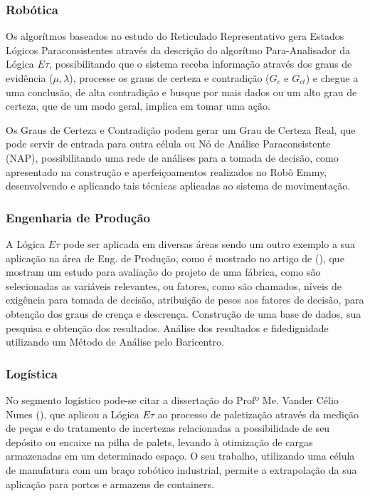 \subsubsection{Robótica}

Os algorítmos baseados no estudo do Reticulado Representativo gera 
Estados Lógicos Paraconsistentes através da 
descrição do algorítmo Para-Analisador da Lógica $E\tau$, 
possibilitando que o sistema receba informação 
através dos graus de evidência ($\mu, \lambda$), 
processe os graus de certeza e contradição ($G_c$ e $G_{ct}$) e 
chegue a uma conclusão, de alta contradição e busque por mais dados ou 
um alto grau de certeza, que de um modo geral, implica em tomar uma ação. 

Os Graus de Certeza e Contradição podem gerar um Grau de Certeza Real, 
que pode servir de entrada para outra célula ou 
Nó de Análise Paraconsistente (NAP), 
possibilitando uma rede de análises para a tomada de decisão,
como apresentado na construção e aperfeiçoamentos realizados no Robô Emmy,
\cite{JoaoInacio}\cite{ClaudioRodrigoTorres} 
desenvolvendo e aplicando tais técnicas aplicadas ao sistema de movimentação.

\subsubsection{Engenharia de Produção}

A Lógica $E\tau$ pode ser aplicada em diversas áreas 
sendo um outro exemplo a sua aplicação na 
área de Eng. de Produção, 
como é mostrado no artigo de 
\citeauthor{FabioIsraelJair}(\citeyear{FabioIsraelJair}), 
que mostram um estudo para avaliação do projeto de uma fábrica, 
como são selecionadas as variáveis relevantes, ou fatores, como são chamados,
níveis de exigência para tomada de decisão, 
atribuição de pesos aos fatores de decisão, 
para obtenção dos graus de crença e descrença. 
Construção de uma base de dados, sua pesquisa e obtenção dos resultados.
Análise dos resultados e fidedignidade utilizando um 
Método de Análise pelo Baricentro.

\subsubsection{Logística}

No segmento logístico pode-se citar a dissertação do 
Profº Me. Vander Célio Nunes (\cite{Vander}), 
que aplicou a Lógica $E\tau$ ao processo de paletização 
através da medição de peças e do tratamento de incertezas 
relacionadas a possibilidade de seu depósito ou encaixe na pilha de palets, 
levando à otimização de cargas armazenadas em um determinado espaço. 
O seu trabalho, utilizando uma célula de manufatura 
com um braço robótico industrial, 
permite a extrapolação da sua aplicação para portos e armazens de containers.



